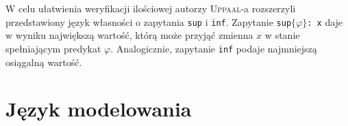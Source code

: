 \documentclass{pracamgr}
\newcommand{\upp}{\textsc{Uppaal}}
\theoremstyle{plain}
\begin{document}
W celu ułatwienia weryfikacji ilościowej autorzy \upp-a rozszerzyli
przedstawiony język własności o zapytania \texttt{sup} i \texttt{inf}.
Zapytanie \texttt{sup$\{\varphi\}$: x} daje w wyniku największą wartość,
którą może przyjąć zmienna $x$ w stanie spełniającym predykat $\varphi$.
Analogicznie, zapytanie \texttt{inf} podaje najmniejszą osiągalną wartość.

\chapter{Język modelowania}


{}

\end{document}
